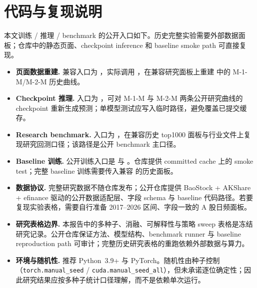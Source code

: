 \documentclass[a4paper,11pt,fontset=fandol]{ctexart}
\begin{document}
\section{代码与复现说明}\label{sec:repro}
本文训练 / 推理 / benchmark 的公开入口如下。历史完整实验需要外部数据面板；仓库中的静态页面、checkpoint inference 和 baseline smoke path 可直接复现。
\begin{itemize}
  \item \textbf{\heiti 页面数据重建.} 兼容入口为 ，实际调用 ，在兼容研究面板上重建  中的 M-1-M/M-2-M 历史曲线。
  \item \textbf{\heiti Checkpoint 推理.} 入口为 ，可对 M-1-M 与 M-2-M 两条公开研究曲线的 checkpoint 重新生成预测；单模型测试应写入临时路径，避免覆盖已提交缓存。
  \item \textbf{\heiti Research benchmark.} 入口为 ，在兼容历史 top1000 面板与行业文件上复现研究回测口径；该路径是公开 benchmark 主口径。
  \item \textbf{\heiti Baseline 训练.} 公开训练入口是  与 。仓库提供 committed cache 上的 smoke test；完整 baseline 训练需要传入兼容  的历史面板。
  \item \textbf{\heiti 数据协议.} 完整研究数据不随仓库发布；公开仓库提供 BaoStock + AKShare + efinance 驱动的公开数据适配层、字段 schema 与 baseline 代码路径。若要复现实验表格，需要自行准备 2017--2026 区间、字段一致的 A 股日频面板。
  \item \textbf{\heiti 研究表格边界.} 本报告中的多种子、消融、可解释性与策略 sweep 表格是冻结研究记录。公开仓库保证方法、模型结构、benchmark runner 与 baseline reproduction path 可审计；完整历史研究表格的重跑依赖外部数据与算力。
  \item \textbf{\heiti 环境与随机性.} 推荐 Python~3.9+ 与 PyTorch。随机性由种子控制（\texttt{torch.manual\_seed} / \texttt{cuda.manual\_seed\_all}），但未承诺逐位确定性；因此研究结果应按多种子统计口径理解，而不是依赖单次运行。
\end{itemize}
\end{document}
